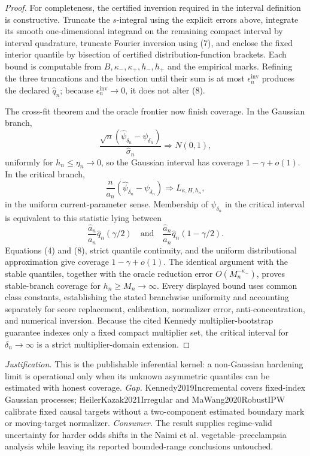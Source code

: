 \documentclass{article}
\begin{document}
\begin{proof}
For completeness, the certified inversion required in the interval definition is constructive.  Truncate the \(s\)-integral using the explicit errors above, integrate its smooth one-dimensional integrand on the remaining compact interval by interval quadrature, truncate Fourier inversion using (7), and enclose the fixed interior quantile by bisection of certified distribution-function brackets.  Each bound is computable from \(B,\kappa_-,\kappa_+,h_-,h_+\) and the empirical marks.  Refining the three truncations and the bisection until their sum is at most \(\epsilon_n^{\mathrm{inv}}\) produces the declared \(\widehat q_n\); because \(\epsilon_n^{\mathrm{inv}}\to0\), it does not alter (8).

The cross-fit theorem and the oracle frontier now finish coverage.  In the Gaussian branch,
\[
 \frac{\sqrt n(\widehat\psi_{\delta_n}-\psi_{\delta_n})}{\widehat\sigma_n}
 \Rightarrow N(0,1),
\]
uniformly for \(h_n\leq\eta_n\to0\), so the Gaussian interval has coverage \(1-\gamma+o(1)\).  In the critical branch,
\[
 \frac n{a_n}(\widehat\psi_{\delta_n}-\psi_{\delta_n})
 \Rightarrow L_{\kappa,H,h_n},
\]
in the uniform current-parameter sense.  Membership of \(\psi_{\delta_n}\) in the critical interval is equivalent to this statistic lying between
\[
 \frac{\widehat a_n}{a_n}\widehat q_n(\gamma/2)
 \quad\text{and}\quad
 \frac{\widehat a_n}{a_n}\widehat q_n(1-\gamma/2).
\]
Equations (4) and (8), strict quantile continuity, and the uniform distributional approximation give coverage \(1-\gamma+o(1)\).  The identical argument with the stable quantiles, together with the oracle reduction error \(O(M_n^{-\kappa_-})\), proves stable-branch coverage for \(h_n\geq M_n\to\infty\).  Every displayed bound uses common class constants, establishing the stated branchwise uniformity and accounting separately for score replacement, calibration, normalizer error, anti-concentration, and numerical inversion.  Because the cited Kennedy multiplier-bootstrap guarantee indexes only a fixed compact multiplier set, the critical interval for \(\delta_n\to\infty\) is a strict multiplier-domain extension.
\end{proof}
\par\smallskip\noindent \textit{Justification.} This is the publishable inferential kernel: a non-Gaussian hardening limit is operational only when its unknown asymmetric quantiles can be estimated with honest coverage. \textit{Gap.} Kennedy2019Incremental covers fixed-index Gaussian processes; HeilerKazak2021Irregular and MaWang2020RobustIPW calibrate fixed causal targets without a two-component estimated boundary mark or moving-target normalizer. \textit{Consumer.} The result supplies regime-valid uncertainty for harder odds shifts in the Naimi et al. vegetable--preeclampsia analysis while leaving its reported bounded-range conclusions untouched.
\end{document}
